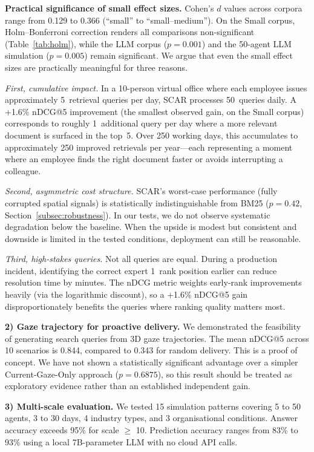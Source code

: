 \documentclass[journal]{IEEEtran}
\begin{document}
\textbf{Practical significance of small effect sizes.}
Cohen's $d$ values across corpora range from 0.129 to 0.366 (``small'' to ``small--medium'').  On the Small corpus, Holm--Bonferroni correction renders all comparisons non-significant (Table~\ref{tab:holm}), while the LLM corpus ($p = 0.001$) and the 50-agent LLM simulation ($p = 0.005$) remain significant.  We argue that even the small effect sizes are practically meaningful for three reasons.

\emph{First, cumulative impact.}  In a 10-person virtual office where each employee issues approximately 5~retrieval queries per day, SCAR processes 50~queries daily.  A +1.6\% nDCG@5 improvement (the smallest observed gain, on the Small corpus) corresponds to roughly 1~additional query per day where a more relevant document is surfaced in the top~5.  Over 250 working days, this accumulates to approximately 250 improved retrievals per year---each representing a moment where an employee finds the right document faster or avoids interrupting a colleague.

\emph{Second, asymmetric cost structure.}  SCAR's worst-case performance (fully corrupted spatial signals) is statistically indistinguishable from BM25 ($p = 0.42$, Section~\ref{subsec:robustness}).  In our tests, we do not observe systematic degradation below the baseline.  When the upside is modest but consistent and downside is limited in the tested conditions, deployment can still be reasonable.

\emph{Third, high-stakes queries.}  Not all queries are equal.  During a production incident, identifying the correct expert 1~rank position earlier can reduce resolution time by minutes.  The nDCG metric weights early-rank improvements heavily (via the logarithmic discount), so a +1.6\% nDCG@5 gain disproportionately benefits the queries where ranking quality matters most.

\textbf{2) Gaze trajectory for proactive delivery.}
We demonstrated the feasibility of generating search queries from 3D gaze trajectories.
The mean nDCG@5 across 10 scenarios is 0.844, compared to 0.343 for random delivery.
This is a proof of concept. We have not shown a statistically
significant advantage over a simpler Current-Gaze-Only approach
($p = 0.6875$), so this result should be treated as exploratory
evidence rather than an established independent gain.

\textbf{3) Multi-scale evaluation.}
We tested 15 simulation patterns covering 5 to 50 agents, 3 to 30 days, 4 industry types, and 3 organisational conditions.
Answer accuracy exceeds 95\% for scale $\geq$ 10.
Prediction accuracy ranges from 83\% to 93\% using a local 7B-parameter LLM with no cloud API calls.
\end{document}

